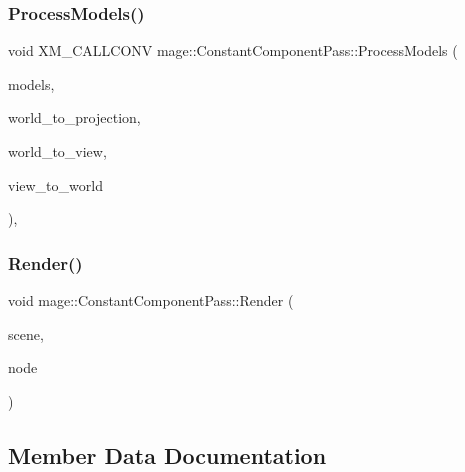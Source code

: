 \subsubsection{\texorpdfstring{Process\+Models()}{ProcessModels()}}
{\footnotesize\ttfamily void X\+M\+\_\+\+C\+A\+L\+L\+C\+O\+NV mage\+::\+Constant\+Component\+Pass\+::\+Process\+Models (\begin{DoxyParamCaption}\item[{const vector$<$ const \hyperlink{classmage_1_1_model_node}{Model\+Node} $\ast$ $>$ \&}]{models,  }\item[{F\+X\+M\+M\+A\+T\+R\+IX}]{world\+\_\+to\+\_\+projection,  }\item[{F\+X\+M\+M\+A\+T\+R\+IX}]{world\+\_\+to\+\_\+view,  }\item[{F\+X\+M\+M\+A\+T\+R\+IX}]{view\+\_\+to\+\_\+world }\end{DoxyParamCaption})\hspace{0.3cm}{\ttfamily [private]}, {\ttfamily [noexcept]}}

\hypertarget{classmage_1_1_constant_component_pass_a28834b441a1a06da954d98abb85c62c4}{}\label{classmage_1_1_constant_component_pass_a28834b441a1a06da954d98abb85c62c4} 
\subsubsection{\texorpdfstring{Render()}{Render()}}
{\footnotesize\ttfamily void mage\+::\+Constant\+Component\+Pass\+::\+Render (\begin{DoxyParamCaption}\item[{const \hyperlink{structmage_1_1_pass_buffer}{Pass\+Buffer} $\ast$}]{scene,  }\item[{const \hyperlink{classmage_1_1_camera_node}{Camera\+Node} $\ast$}]{node }\end{DoxyParamCaption})}



\subsection{Member Data Documentation}
\hypertarget{classmage_1_1_constant_component_pass_aa1a97c7be7054c1a1362ca15d9909446}{}\label{classmage_1_1_constant_component_pass_aa1a97c7be7054c1a1362ca15d9909446} 
